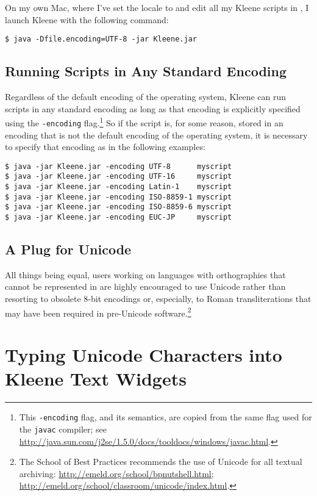 \noindent
On my own Mac, where I've set the locale to  and edit all my Kleene
scripts in , I launch Kleene with the following command:

\begin{Verbatim}
$ java -Dfile.encoding=UTF-8 -jar Kleene.jar
\end{Verbatim}

\subsection{Running Scripts in Any Standard Encoding}

Regardless of the default encoding of the operating system, Kleene can
run scripts in any standard encoding as long as that encoding is
explicitly specified using the \texttt{-encoding} flag.\footnote{This
\texttt{-encoding} flag, and its semantics, are copied from the same flag
used for the \texttt{javac} compiler; see
\url{http://java.sun.com/j2se/1.5.0/docs/tooldocs/windows/javac.html}.}
So if the script is, for some reason, stored in an encoding that is not
the default encoding of the operating system, it is necessary to specify
that encoding as in the following examples: 

\begin{Verbatim}
$ java -jar Kleene.jar -encoding UTF-8      myscript
$ java -jar Kleene.jar -encoding UTF-16     myscript
$ java -jar Kleene.jar -encoding Latin-1    myscript
$ java -jar Kleene.jar -encoding ISO-8859-1 myscript
$ java -jar Kleene.jar -encoding ISO-8859-6 myscript
$ java -jar Kleene.jar -encoding EUC-JP     myscript
\end{Verbatim}

\subsection{A Plug for Unicode}

All things being equal, users working on languages with orthographies
that cannot be represented in  are highly encouraged to use
Unicode rather than resorting to obsolete 8-bit encodings or, especially,
to Roman transliterations that may have been required in pre-Unicode
software.\footnote{The  School of Best Practices recommends
the use of Unicode for all textual archiving:
\url{http://emeld.org/school/bpnutshell.html};
\url{http://emeld.org/school/classroom/unicode/index.html}.}

\section{Typing Unicode Characters into Kleene  Text Widgets}

